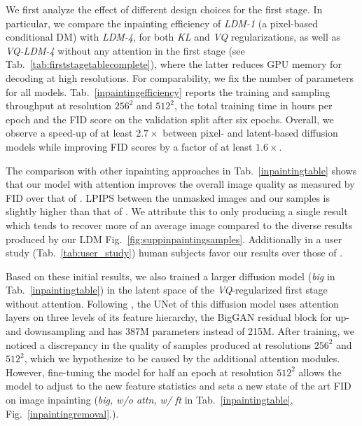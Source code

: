 \documentclass[10pt,twocolumn,letterpaper]{article}
\begin{document}
We first analyze the effect of different design choices for
the first stage. 
\inpaintingefficiency
\inpaintingremoval
In particular, we compare the inpainting efficiency of \emph{LDM-1} 
(\ie a pixel-based conditional DM) with
%
%
\emph{LDM-4}, for both \emph{KL} and \emph{VQ} regularizations,
as well as \emph{VQ-LDM-4} without any attention in the first stage
(see Tab.~\ref{tab:firststagetablecomplete}), where the latter reduces GPU memory for decoding at high resolutions. For comparability, we fix the number of parameters for all models.
%
%
%
%
%
Tab.~\ref{inpaintingefficiency} reports the training and sampling throughput 
%
at resolution $256^{2}$ and $512^{2}$, the total training time in hours
per epoch and the FID score on the validation split after six epochs. Overall,
we observe a speed-up of at least $2.7\times$ between pixel- and latent-based
diffusion models while improving FID scores by a factor of at least $1.6\times$. 

The comparison with other inpainting approaches in Tab.~\ref{inpaintingtable}
shows that our model with attention improves the overall image quality as
measured by FID over that of \cite{lama}. LPIPS between the unmasked
images and our samples is slightly higher than that of \cite{lama}.
%
We attribute this to \cite{lama} only producing a
single result which tends to recover more of an average image
compared to the diverse results produced by our LDM 
%
\cf Fig.~\ref{fig:suppinpaintingsamples}. 
%
%
Additionally in a user study (Tab.~\ref{tab:user_study}) human subjects favor our results over those of \cite{lama}.

Based on these initial results, we also trained a larger diffusion model
(\emph{big} in Tab.~\ref{inpaintingtable}) in the
latent space of the \emph{VQ}-regularized first stage without attention.
Following \cite{DBLP:journals/corr/abs-2105-05233}, the UNet of this diffusion model uses attention layers on
three levels of its feature hierarchy, the BigGAN \cite{bigganbrock} residual block
for up- and downsampling and has 387M parameters instead of 215M.
After training, we noticed a discrepancy in the quality of samples produced at
resolutions $256^2$ and $512^2$, which we hypothesize to be caused by the
additional attention modules. However, fine-tuning the model for half an epoch
at resolution $512^2$ allows the model to adjust to the new feature statistics
and sets a new state of the art FID on image inpainting (\emph{big, w/o attn, w/
ft} in Tab.~\ref{inpaintingtable}, Fig.~\ref{inpaintingremoval}.).
\end{document}
